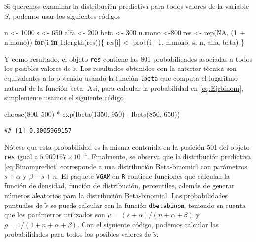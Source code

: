 \documentclass[
  10pt,
  spanish,
]{book}
\newenvironment{Shaded}{\begin{snugshade}}{\end{snugshade}}
\newcommand{\ConstantTok}[1]{\textcolor[rgb]{0.00,0.00,0.00}{#1}}
\newcommand{\ControlFlowTok}[1]{\textcolor[rgb]{0.13,0.29,0.53}{\textbf{#1}}}
\newcommand{\DecValTok}[1]{\textcolor[rgb]{0.00,0.00,0.81}{#1}}
\newcommand{\FunctionTok}[1]{\textcolor[rgb]{0.00,0.00,0.00}{#1}}
\newcommand{\NormalTok}[1]{#1}
\newcommand{\OtherTok}[1]{\textcolor[rgb]{0.56,0.35,0.01}{#1}}
\newcommand{\SpecialCharTok}[1]{\textcolor[rgb]{0.00,0.00,0.00}{#1}}
\theoremstyle{definition}
\theoremstyle{definition}
\theoremstyle{definition}
\theoremstyle{definition}
\theoremstyle{remark}
\begin{document}
Si queremos examinar la distribución predictiva para todos valores de la
variable \(\tilde{S}\), podemos usar los siguientes códigos

\begin{Shaded}
\begin{Highlighting}[]
\NormalTok{n }\OtherTok{\textless{}{-}} \DecValTok{1000}
\NormalTok{s }\OtherTok{\textless{}{-}} \DecValTok{650} 
\NormalTok{alfa }\OtherTok{\textless{}{-}} \DecValTok{200}
\NormalTok{beta }\OtherTok{\textless{}{-}} \DecValTok{300} 
\NormalTok{n.mono }\OtherTok{\textless{}{-}}\DecValTok{800}
\NormalTok{res }\OtherTok{\textless{}{-}} \FunctionTok{rep}\NormalTok{(}\ConstantTok{NA}\NormalTok{, (}\DecValTok{1} \SpecialCharTok{+}\NormalTok{ n.mono)) }
\ControlFlowTok{for}\NormalTok{(i }\ControlFlowTok{in} \DecValTok{1}\SpecialCharTok{:}\FunctionTok{length}\NormalTok{(res))\{}
\NormalTok{  res[i] }\OtherTok{\textless{}{-}} \FunctionTok{prob}\NormalTok{(i }\SpecialCharTok{{-}} \DecValTok{1}\NormalTok{, n.mono, s, n, alfa, beta)}
\NormalTok{\}}
\end{Highlighting}
\end{Shaded}

Y como resultado, el objeto \texttt{res} contiene las 801 probabilidades asociadas a todos los posibles valores de \(\tilde{s}\). Los resultados obtenidos con la anterior técnica son equivalentes a lo
obtenido usando la función \texttt{lbeta} que computa el logaritmo natural
de la función beta. Así, para calcular la probabilidad en
\eqref{eq:Ejebinom}, simplemente usamos el siguiente código

\begin{Shaded}
\begin{Highlighting}[]
\FunctionTok{choose}\NormalTok{(}\DecValTok{800}\NormalTok{, }\DecValTok{500}\NormalTok{) }\SpecialCharTok{*} \FunctionTok{exp}\NormalTok{(}\FunctionTok{lbeta}\NormalTok{(}\DecValTok{1350}\NormalTok{, }\DecValTok{950}\NormalTok{) }\SpecialCharTok{{-}} \FunctionTok{lbeta}\NormalTok{(}\DecValTok{850}\NormalTok{, }\DecValTok{650}\NormalTok{)) }
\end{Highlighting}
\end{Shaded}

\begin{verbatim}
## [1] 0.0005969157
\end{verbatim}

Nótese que esta probabilidad es la misma contenida en la posición 501 del objeto \texttt{res} igual a \ensuremath{5.969157\times 10^{-4}}. Finalmente, se observa que la distribución predictiva \eqref{eq:Binompredict} corresponde a una distribución
Beta-binomial con parámetros \(s+\alpha\) y \(\beta-s+n\). El paquete
\texttt{VGAM} \citep{VGAM} en \texttt{R} contiene funciones que calculan la
función de densidad, función de distribución, percentiles, además de
generar números aleatorios para la distribución Beta-binomial. Las
probabilidades puntuales de \(\tilde{s}\) se puede calcular con la función
\texttt{dbetabinom}, teniendo en cuenta que los parámetros utilizados son
\(\mu=(s+\alpha)/(n+\alpha+\beta)\) y \(\rho=1/(1+n+\alpha+\beta)\). Con el
siguiente código, podemos calcular las probabilidades para todos los
posibles valores de \(\tilde{s}\).
\end{document}
